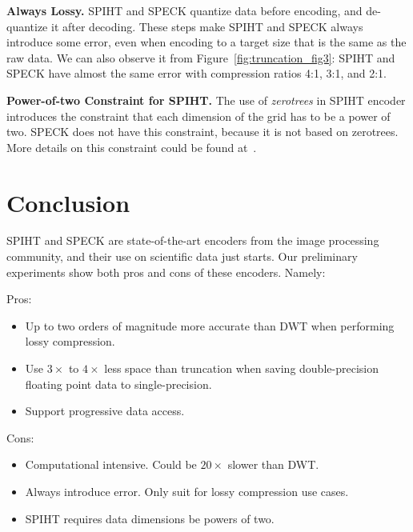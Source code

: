 \documentclass[review]{vgtc}                 %
\newenvironment{tightItemize}{
\begin{itemize}
        \setlength{\itemsep}{1pt}
        \setlength{\parskip}{0pt}
        \setlength{\parsep}{0pt}
}{\end{itemize}
}
\begin{document}
\textbf{Always Lossy.}
%
SPIHT and SPECK quantize data before encoding,
and de-quantize it after decoding.
%
These steps make SPIHT and SPECK always introduce some error,
even when encoding to a target size that is the same as the raw data.
%
We can also observe it from Figure~\ref{fig:truncation_fig3}:
SPIHT and SPECK have almost the same error with compression ratios
4:1, 3:1, and 2:1.

\textbf{Power-of-two Constraint for SPIHT.}
%
The use of \textit{zerotrees} in SPIHT encoder introduces the constraint that
each dimension of the grid has to be a power of two.
%
SPECK does not have this constraint, because it is not based on zerotrees.
%
More details on this constraint could be found at~\cite{qcc1}.


\section{Conclusion}
%
SPIHT and SPECK are state-of-the-art encoders from the image processing
community, and their use on scientific data just starts.
%
Our preliminary experiments show both pros and cons of these encoders. 
Namely:

Pros:
\begin{tightItemize}
    \item Up to two orders of magnitude more accurate than DWT
          when performing lossy compression.
    \item Use $3\times$ to $4\times$ less space than truncation
          when saving double-precision floating point data to single-precision.
    \item Support progressive data access. 
\end{tightItemize}

Cons:
\begin{tightItemize}
    \item Computational intensive. Could be $20\times$ slower than DWT.
    \item Always introduce error. Only suit for lossy compression use cases.
    \item SPIHT requires data dimensions be powers of two.
\end{tightItemize}




\end{document}
